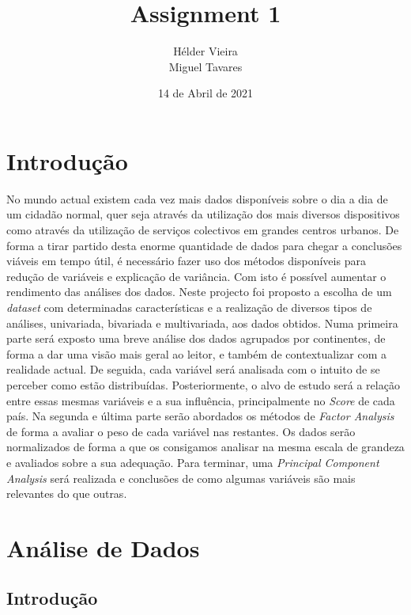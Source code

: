 \documentclass[12pt, a4paper]{article}
\title{Assignment 1}
\author{Hélder Vieira\\Miguel Tavares}
\date{14 de Abril de 2021}
\begin{document}
\maketitle


\section{Introdução} %
\label{sec:introdução}

No mundo actual existem cada vez mais dados disponíveis sobre o dia a
dia de um cidadão normal, quer seja através da utilização dos mais
diversos dispositivos como através da utilização de serviços colectivos
em grandes centros urbanos. De forma a tirar partido desta enorme
quantidade de dados para chegar a conclusões viáveis em tempo útil, é
necessário fazer uso dos métodos disponíveis para redução de variáveis e
explicação de variância. Com isto é possível aumentar o rendimento das
análises dos dados. Neste projecto foi
proposto a escolha de um \emph{dataset} com determinadas características
e a realização de diversos tipos de análises, univariada, bivariada e
multivariada, aos dados obtidos. Numa
primeira parte será exposto uma breve análise dos dados agrupados por
continentes, de forma a dar uma visão mais geral ao leitor, e também de
contextualizar com a realidade actual. De seguida, cada variável será
analisada com o intuito de se perceber como estão distribuídas.
Posteriormente, o alvo de estudo será a relação entre essas mesmas
variáveis e a sua influência, principalmente no \emph{Score} de cada
país. Na segunda e última parte serão
abordados os métodos de \emph{Factor Analysis} de forma a avaliar o peso
de cada variável nas restantes. Os dados serão normalizados de forma a
que os consigamos analisar na mesma escala de grandeza e avaliados sobre
a sua adequação. Para terminar, uma \emph{Principal Component Analysis}
será realizada e conclusões de como algumas variáveis são mais
relevantes do que outras.



\section{Análise de Dados} %
\label{sec:análise_de_dados}

\subsection{Introdução} %
\label{sub:introdução}
\end{document}
